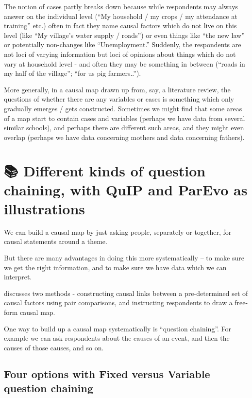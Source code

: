 \documentclass[
]{book}
\begin{document}
The notion of cases partly breaks down because while respondents may always answer on the individual level (``My household / my crops / my attendance at training'' etc.) often in fact they name causal factors which do not live on this level (like ``My village's water supply / roads'') or even things like ``the new law'' or potentially non-changes like ``Unemployment.'' Suddenly, the respondents are not loci of varying information but loci of opinions about things which do not vary at household level - and often they may be something in between (``roads in my half of the village''; ``for us pig farmers..'').

More generally, in a causal map drawn up from, say, a literature review, the questions of whether there are any variables or cases is something which only gradually emerges / gets constructed. Sometimes we might find that some areas of a map start to contain cases and variables (perhaps we have data from several similar schools), and perhaps there are different such areas, and they might even overlap (perhaps we have data concerning mothers and data concerning fathers).

\hypertarget{different-kinds-of-question-chaining-with-quip-and-parevo-as-illustrations}{%
\chapter{📚 Different kinds of question chaining, with QuIP and ParEvo as illustrations}\label{different-kinds-of-question-chaining-with-quip-and-parevo-as-illustrations}}

We can build a causal map by just asking people, separately or together, for causal statements around a theme.

But there are many advantages in doing this more systematically -- to make sure we get the right information, and to make sure we have data which we can interpret.

discusses two methods - constructing causal links between a pre-determined set of causal factors using pair comparisons, and instructing respondents to draw a free-form causal map.

One way to build up a causal map systematically is ``question chaining''. For example we can ask respondents about the causes of an event, and then the causes of those causes, and so on.

\hypertarget{four-options-with-fixed-versus-variable-question-chaining}{%
\section{Four options with Fixed versus Variable question chaining}\label{four-options-with-fixed-versus-variable-question-chaining}}
\end{document}
